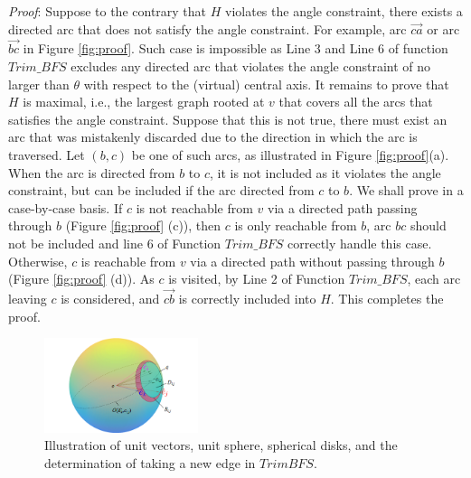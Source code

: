 \emph{Proof}: Suppose to the contrary that $H$ violates the angle constraint, there exists a directed arc that does not satisfy the angle constraint. For example, arc $\overrightarrow{ca}$ or arc $\overrightarrow{bc}$ in Figure \ref{fig:proof}. Such case is impossible as Line $3$ and Line $6$ of function $Trim\_BFS$ excludes any directed arc that violates the angle constraint of no larger than $\theta$ with respect to the (virtual) central axis.
It remains to prove that $H$ is maximal, i.e., the largest graph rooted at $v$ that covers all the arcs that satisfies the angle constraint. Suppose that this is not true, there must exist an arc that was mistakenly discarded due to the direction in which the arc is traversed. Let $(b, c)$ be one of such arcs, as illustrated in Figure \ref{fig:proof}(a). When the arc is directed from $b$ to $c$, it is not included as it violates the angle constraint, but can be included if the arc directed from $c$ to $b$. We shall prove in a case-by-case basis.
If $c$ is not reachable from $v$ via a directed path passing through $b$ (Figure \ref{fig:proof} (c)), then $c$ is only reachable from $b$, arc $bc$ should not be included and line 6 of Function $Trim\_BFS$ correctly handle this case.
Otherwise, $c$ is reachable from $v$ via a directed path without passing through $b$ (Figure \ref{fig:proof} (d)). As $c$ is visited, by Line 2 of Function $Trim\_BFS$, each arc leaving $c$ is considered, and $\overrightarrow{cb}$ is correctly included into $H$. This completes the proof.



\begin{figure}[tbp]
  \centering
  \includegraphics[width=0.4\textwidth]{figs/take_arc.png}
  \caption{\label{fig:sphere}%
           Illustration of unit vectors, unit sphere, spherical disks, and the determination of taking a new edge in $TrimBFS$.}
\end{figure}

